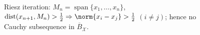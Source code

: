 \documentclass[a4paper]{article}
\begin{document}
\thispagestyle{empty}
\begin{figure}[H]
  \centering
  
  \caption{Riesz iteration: $M_n=\operatorname{span}\{x_1,\ldots,x_n\}$, $\operatorname{dist}(x_{n+1},M_n)>\frac{1}{2}\Rightarrow \norm{x_i-x_j}>\frac{1}{2}$ $(i\neq j)$; hence no Cauchy subsequence in $\overline{B}_{\mathcal X}$.}
\end{figure}
\end{document}
